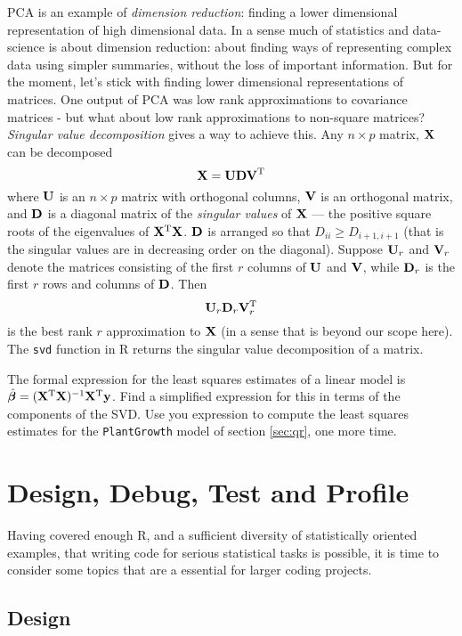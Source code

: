 \documentclass[10pt] {article}
\newcommand{\bp}{{\vm \beta}}
\newcommand{\X}{{\vf X}}
\newcommand{\vf}{\bf} %
\newcommand{\vm}{\bm} %
\newcommand{\ts}{^{\rm T}}
\theoremstyle{definition}
\begin{document}
PCA is an example of {\em dimension reduction}: finding a lower dimensional representation of high dimensional data. In a sense much of statistics and data-science is about dimension reduction: about finding ways of representing complex data using simpler summaries, without the loss of important information. But for the moment, let's stick with finding lower dimensional representations of matrices. One output of PCA was low rank approximations to covariance matrices - but what about low rank approximations to non-square matrices? {\em Singular value decomposition} gives a way to achieve this. Any $n \times p$ matrix, $\bf X$ can be decomposed
$$
\X = {\bf U}{\bf DV}\ts
$$ 
where $\bf U $ is an $n \times p $ matrix with orthogonal columns, $\bf V$ is an orthogonal matrix, and $\bf D$ is a diagonal matrix of the {\em singular values} of $\bf X$ --- the positive square roots of the eigenvalues of ${\bf X}\ts {\bf X}$. $\bf D$ is arranged so that $D_{ii} \ge D_{i+1,i+1}$ (that is the singular values are in decreasing order on the diagonal). Suppose ${\bf U}_r$ and ${\bf V}_r$ denote the matrices consisting of the first $r$ columns of $\bf U$ and $\bf V$, while ${\bf D}_r$ is the first $r$ rows and columns of $\bf D$. Then
$$
{\bf U}_r{\bf D}_r{\bf V}_r\ts
$$
is the best rank $r$ approximation to $\X$ (in a sense that is beyond our scope here). The {\tt svd} function in R returns the singular value decomposition of a matrix. 

 The formal expression for the least squares estimates of a linear model is $\hat \bp = (\X\ts \X)^{-1} \X \ts {\bf y}$. Find a simplified expression for this in terms of the components of the SVD. Use you expression to compute the least squares estimates for the {\tt PlantGrowth} model of section \ref{sec:qr}, one more time.  

\section{Design, Debug, Test and Profile}

Having covered enough R, and a sufficient diversity of statistically oriented examples, that writing code for serious statistical tasks is possible, it is time to consider some topics that are a essential for larger coding projects. 

\subsection{Design}
\end{document}
